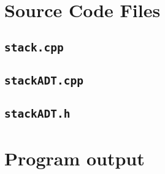 \documentclass{article}
\begin{document}
\section{Source Code Files}
    \subsection{\texttt{stack.cpp}}
        
        \newpage
    \subsection{\texttt{stackADT.cpp}}
        
        \newpage
    \subsection{\texttt{stackADT.h}}
        
        \newpage

    
\section{Program output}
    
\end{document}
